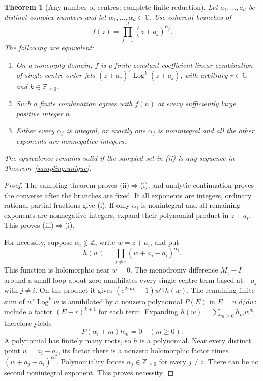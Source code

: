 \documentclass[11pt]{article}
\numberwithin{equation}{section}
\theoremstyle{plain}
\newtheorem{theorem}{Theorem}[section]
\theoremstyle{definition}
\theoremstyle{remark}
\DeclareMathOperator{\Log}{Log}
\newcommand{\C}{\mathbb C}
\newcommand{\Z}{\mathbb Z}
\newcommand{\ii}{\mathrm i}
\begin{document}
\begin{theorem}[Any number of centres: complete finite reduction]
\label{sampling:centres}
Let $a_1,\ldots,a_d$ be distinct complex numbers and let
$\alpha_1,\ldots,\alpha_d\in\C$. Use coherent branches of
\[
                       f(z)=\prod_{j=1}^d(z+a_j)^{\alpha_j}.
\]
The following are equivalent:
\begin{enumerate}[label=(\roman*)]
\item On a nonempty domain, $f$ is a finite constant-coefficient
linear combination of single-centre order jets
$(z+a_j)^r\Log^k(z+a_j)$, with arbitrary $r\in\C$ and
$k\in\Z_{\ge0}$.
\item Such a finite combination agrees with $f(n)$ at every
sufficiently large positive integer $n$.
\item Either every $\alpha_j$ is integral, or exactly one
$\alpha_j$ is nonintegral and all the other exponents are
nonnegative integers.
\end{enumerate}
The equivalence remains valid if the sampled set in (ii) is any
sequence in Theorem~\ref{sampling:unique}.
\end{theorem}
\begin{proof}
The sampling theorem proves (ii)$\Rightarrow$(i), and analytic
continuation proves the converse after the branches are fixed. If all
exponents are integers, ordinary rational partial fractions give (i).
If only $\alpha_i$ is nonintegral and all remaining exponents are
nonnegative integers, expand their polynomial product in $z+a_i$.
This proves (iii)$\Rightarrow$(i).

For necessity, suppose $\alpha_i\notin\Z$, write $w=z+a_i$, and put
\[
             h(w)=\prod_{j\ne i}(w+a_j-a_i)^{\alpha_j}.
\]
This function is holomorphic near $w=0$. The monodromy difference
$M_i-I$ around a small loop about zero annihilates every single-centre
term based at $-a_j$ with
$j\ne i$. On the product it gives
$(e^{2\pi\ii\alpha_i}-1)w^{\alpha_i}h(w)$.
The remaining finite sum of $w^r\Log^k w$ is annihilated by a
nonzero polynomial $P(E)$ in $E=w\,d/dw$: include a factor
$(E-r)^{k+1}$ for each term. Expanding $h(w)=\sum_{m\ge0}h_mw^m$
therefore yields
\[
                         P(\alpha_i+m)h_m=0\quad(m\ge0).
\]
A polynomial has finitely many roots, so $h$ is a polynomial.
Near every distinct point $w=a_i-a_j$, its factor there is a
nonzero holomorphic factor times $(w+a_j-a_i)^{\alpha_j}$.
Polynomiality forces $\alpha_j\in\Z_{\ge0}$ for every $j\ne i$.
There can be no second nonintegral exponent. This proves necessity.
\end{proof}
\end{document}
